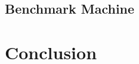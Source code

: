 \documentclass[conference]{IEEEtran}
\begin{document}
\subsection{Benchmark Machine}

\section{Conclusion}


%
%



%
%
\end{document}
